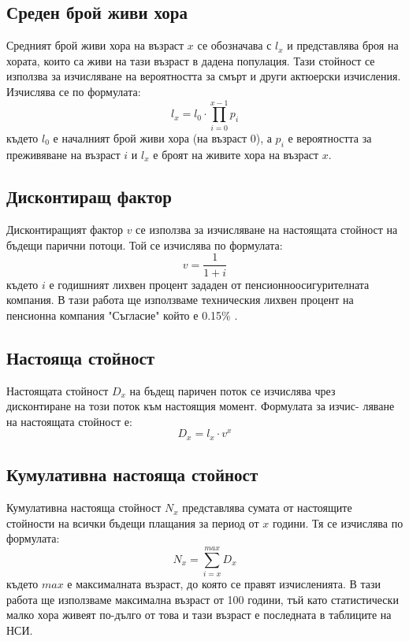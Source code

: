 \documentclass[a4paper,12pt]{article}
\begin{document}
\subsection{Среден брой живи хора}
Средният брой живи хора на възраст $x$ се обозначава с $l_x$ и представлява броя на хората, които са живи на тази възраст в дадена популация. Тази стойност се използва за изчисляване на вероятността за смърт и други актюерски изчисления. Изчислява се по формулата:
\[l_{x} = l_0 \cdot \prod_{i=0}^{x-1} p_i\]
където $l_0$ е началният брой живи хора (на възраст 0), а $p_i$ е вероятността за преживяване на възраст $i$ и $l_x$ е броят на живите хора на възраст $x$.
\subsection{Дисконтиращ фактор}
Дисконтиращият фактор $v$ се използва за изчисляване на настоящата стойност на бъдещи парични потоци. Той се изчислява по формулата:
\[v = \frac{1}{1+i}\]
където $i$ е годишният лихвен процент зададен от пенсионноосигурителната компания. В тази работа ще използваме техническия лихвен процент на пенсионна компания "Съгласие" който е 0.15\% \cite{DKFN_Pensions}.
\subsection{Настояща стойност}
Настоящата стойност $D_x$ на бъдещ паричен поток се изчислява чрез дисконтиране на този поток към настоящия момент. Формулата за изчис- ляване на настоящата стойност е:
\[D_x = l_x\cdot v^x\]
\subsection{Кумулативна настояща стойност}
Кумулативна настояща стойност $N_x$ представлява сумата от настоящите стойности на всички бъдещи плащания за период от $x$ години. Тя се изчислява по формулата:
\[N_x = \sum_{i=x}^{max}D_x\]
където $max$ е максималната възраст, до която се правят изчисленията. В тази работа ще използваме максимална възраст от 100 години, тъй като статистически малко хора живеят по-дълго от това и тази възраст е последната в таблиците на НСИ.
\end{document}
